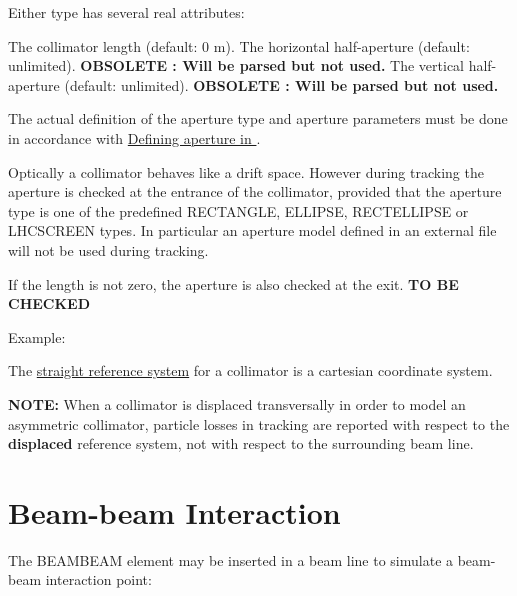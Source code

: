 
Either type has several real attributes: 
\begin{madlist}
    The collimator length (default: 0 m). 
    The horizontal half-aperture (default:
     unlimited). \textbf{OBSOLETE : Will be parsed but not used.} 
    The vertical half-aperture (default:
     unlimited). \textbf{OBSOLETE : Will be parsed but not used.} 
\end{madlist}

The actual definition of the aperture type and aperture parameters must
be done in accordance with \href{aperture.html}{Defining aperture in
  \madx}.   

Optically a collimator behaves like a drift space.  However during
tracking the aperture is checked at the entrance of the collimator,
provided that the aperture type is one of the predefined RECTANGLE,
ELLIPSE, RECTELLIPSE or LHCSCREEN types.  In particular an aperture
model defined in an external file will not be used during tracking.  

If the length is not zero, the aperture is also checked at the
exit. \textbf{ TO BE CHECKED } 

Example: 

The \href{local_system.html#straight}{straight reference system} for a
collimator is a cartesian coordinate system.  

\textbf{NOTE:} When a collimator is displaced transversally in order to
model  an asymmetric collimator, particle losses in tracking are
reported with respect to the \textbf{displaced} reference system, not
with respect to the surrounding beam line.  




\section{Beam-beam Interaction}
The BEAMBEAM element may be inserted in a beam line to simulate a
beam-beam interaction point:  
 


